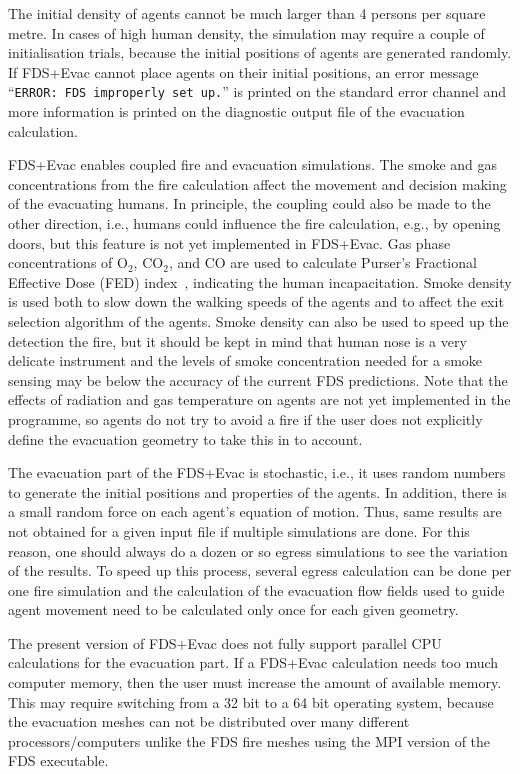 \documentclass[12pt,a4paper,final,twoside]{stylevk}
\begin{document}
The initial density of agents cannot be much larger than 4 persons per
square metre.  In cases of high human density, the simulation may
require a couple of initialisation trials, because the initial
positions of agents are generated randomly. If FDS+Evac cannot place
agents on their initial positions, an error message ``\texttt{ERROR: FDS
improperly set up.}'' is printed on the standard error channel and more
information is printed on the diagnostic output file of the evacuation
calculation.


FDS+Evac enables coupled fire and evacuation simulations.  The smoke
and gas concentrations from the fire calculation affect the movement
and decision making of the evacuating humans.  In principle, the
coupling could also be made to the other direction, i.e.,
humans could influence the fire calculation, e.g., by opening
doors, but this feature is not yet implemented in FDS+Evac.  Gas phase
concentrations of $\mathrm{O_2}$, $\mathrm{CO_2}$, and $\mathrm{CO}$
are used to calculate Purser's Fractional Effective Dose (FED)
index~\cite{Purser95}, indicating the human incapacitation.  Smoke
density is used both to slow down the walking speeds of the agents and
to affect the exit selection algorithm of the agents.  Smoke density
can also be used to speed up the detection the fire, but it should be
kept in mind that human nose is a very delicate instrument and the
levels of smoke concentration needed for a smoke sensing may be below
the accuracy of the current FDS predictions.  Note that the effects of
radiation and gas temperature on agents are not yet implemented in the
programme, so agents do not try to avoid a fire if the user does not
explicitly define the evacuation geometry to take this in to account.


The evacuation part of the FDS+Evac is stochastic, i.e., it
uses random numbers to generate the initial positions and properties
of the agents.  In addition, there is a small random force on each
agent's equation of motion.  Thus, same results are not obtained for a
given input file if multiple simulations are done.  For this reason,
one should always do a dozen or so egress simulations to see the
variation of the results.  To speed up this process, several egress
calculation can be done per one fire simulation and the calculation of
the evacuation flow fields used to guide agent movement need to be
calculated only once for each given geometry.


The present version of FDS+Evac does not fully support parallel CPU
calculations for the evacuation part.  If a FDS+Evac calculation needs
too much computer memory, then the user must increase the amount of
available memory.  This may require switching from a 32 bit to a 64
bit operating system, because the evacuation meshes can not be
distributed over many different processors/computers unlike the FDS
fire meshes using the MPI version of the FDS executable.
\end{document}
